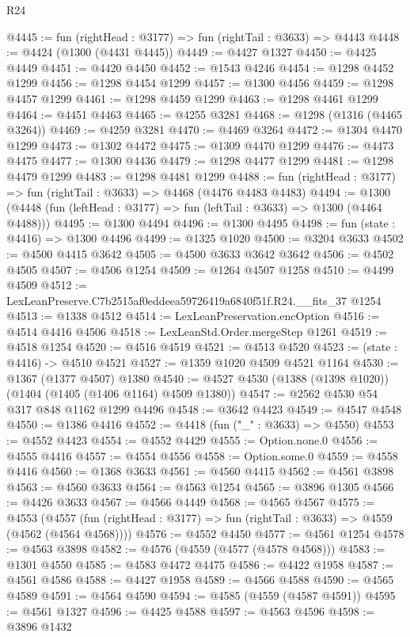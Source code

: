 \begin{lexlean}{R24}
\begin{coremodule}
@4445 := fun (rightHead : @3177) => fun (rightTail : @3633) => @4443
@4448 := @4424 (@1300 (@4431 @4445))
@4449 := @4427 @1327
@4450 := @4425 @4449
@4451 := @4420 @4450
@4452 := @1543 @4246
@4454 := @1298 @4452 @1299
@4456 := @1298 @4454 @1299
@4457 := @1300 @4456
@4459 := @1298 @4457 @1299
@4461 := @1298 @4459 @1299
@4463 := @1298 @4461 @1299
@4464 := @4451 @4463
@4465 := @4255 @3281
@4468 := @1298 (@1316 (@4465 @3264))
@4469 := @4259 @3281
@4470 := @4469 @3264
@4472 := @1304 @4470 @1299
@4473 := @1302 @4472
@4475 := @1309 @4470 @1299
@4476 := @4473 @4475
@4477 := @1300 @4436
@4479 := @1298 @4477 @1299
@4481 := @1298 @4479 @1299
@4483 := @1298 @4481 @1299
@4488 := fun (rightHead : @3177) => fun (rightTail : @3633) => @4468 (@4476 @4483 @4483)
@4494 := @1300 (@4448 (fun (leftHead : @3177) => fun (leftTail : @3633) => @1300 (@4464 @4488)))
@4495 := @1300 @4494
@4496 := @1300 @4495
@4498 := fun (state : @4416) => @1300 @4496
@4499 := @1325 @1020
@4500 := @3204 @3633
@4502 := @4500 @4415 @3642
@4505 := @4500 @3633 @3642 @3642
@4506 := @4502 @4505
@4507 := @4506 @1254
@4509 := @1264 @4507 @1258
@4510 := @4499 @4509
@4512 := LexLeanPreserve.C7b2515af0eddeea59726419a6840f51f.R24.__fits_37 @1254
@4513 := @1338 @4512
@4514 := LexLeanPreservation.encOption
@4516 := @4514 @4416 @4506
@4518 := LexLeanStd.Order.mergeStep @1261
@4519 := @4518 @1254
@4520 := @4516 @4519
@4521 := @4513 @4520
@4523 := (state : @4416) -> @4510 @4521
@4527 := @1359 @1020 @4509 @4521 @1164
@4530 := @1367 (@1377 @4507) @1380
@4540 := @4527 @4530 (@1388 (@1398 @1020)) (@1404 (@1405 (@1406 @1164) @4509 @1380))
@4547 := @2562 @4530 @54 @317 @848 @1162 @1299 @4496
@4548 := @3642 @4423
@4549 := @4547 @4548
@4550 := @1386 @4416
@4552 := @4418 (fun ("_" : @3633) => @4550)
@4553 := @4552 @4423
@4554 := @4552 @4429
@4555 := Option.none.{0}
@4556 := @4555 @4416
@4557 := @4554 @4556
@4558 := Option.some.{0}
@4559 := @4558 @4416
@4560 := @1368 @3633
@4561 := @4560 @4415
@4562 := @4561 @3898
@4563 := @4560 @3633
@4564 := @4563 @1254
@4565 := @3896 @1305
@4566 := @4426 @3633
@4567 := @4566 @4449
@4568 := @4565 @4567
@4575 := @4553
    (@4557 (fun (rightHead : @3177) => fun (rightTail : @3633) => @4559 (@4562 (@4564 @4568))))
@4576 := @4552 @4450
@4577 := @4561 @1254
@4578 := @4563 @3898
@4582 := @4576 (@4559 (@4577 (@4578 @4568)))
@4583 := @1301 @4550
@4585 := @4583 @4472 @4475
@4586 := @4422 @1958
@4587 := @4561 @4586
@4588 := @4427 @1958
@4589 := @4566 @4588
@4590 := @4565 @4589
@4591 := @4564 @4590
@4594 := @4585 (@4559 (@4587 @4591))
@4595 := @4561 @1327
@4596 := @4425 @4588
@4597 := @4563 @4596
@4598 := @3896 @1432

\end{coremodule}
\end{lexlean}
